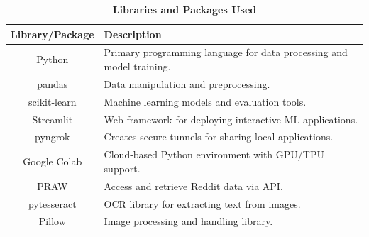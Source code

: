 \begin{table}[h]
    \centering
    \renewcommand{\arraystretch}{1.2}
    \begin{tabular}{|c|p{12cm}|}
        \hline
        \rowcolor{lightestgray}
        \textbf{Library/Package} & \textbf{Description} \\
        \hline
        Python & Primary programming language for data processing and model training. \\
        \hline
        pandas & Data manipulation and preprocessing. \\
        \hline
        scikit-learn & Machine learning models and evaluation tools. \\
        \hline
        Streamlit & Web framework for deploying interactive ML applications. \\
        \hline
        pyngrok & Creates secure tunnels for sharing local applications. \\
        \hline
        Google Colab & Cloud-based Python environment with GPU/TPU support. \\
        \hline
        PRAW & Access and retrieve Reddit data via API. \\
        \hline
        pytesseract & OCR library for extracting text from images. \\
        \hline
        Pillow & Image processing and handling library. \\
        \hline
    \end{tabular}
    \caption*{\textbf{Libraries and Packages Used}}
    \label{tab:libraries}
\end{table}

